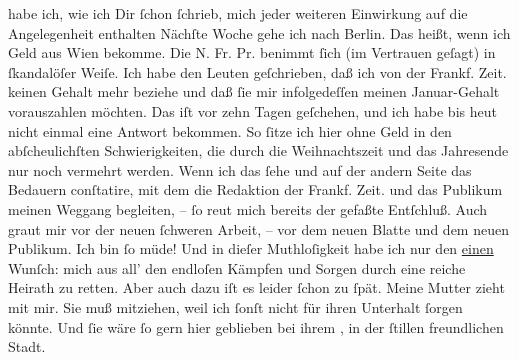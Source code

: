 \begin{ledgroupsized}[t]{13cm}
               habe ich, wie ich Dir ſchon ſchrieb, \strikeout{\textcolor{gray}{×}\-\textcolor{gray}{×}\-\textcolor{gray}{×}} mich jeder weiteren Einwirkung auf die Angelegenheit enthalten{\dotsfour}\pend
           \pstart
           Nächſte Woche gehe ich nach Berlin. Das heißt,
               wenn ich Geld aus Wien bekomme. Die N. Fr. Pr. benimmt ſich {\pb}(im
               Vertrauen geſagt) in ſkandalöſer Weiſe. Ich habe den Leuten geſchrieben, daß ich von der Frankf. Zeit. keinen Gehalt mehr beziehe und daß ſie mir
               infolgedeſſen meinen Januar-Gehalt vorauszahlen möchten.
               Das iſt vor zehn Tagen geſchehen, und ich habe bis heut nicht einmal eine Antwort bekommen. So ſitze ich hier ohne Geld in
               den abſcheulichſten Schwierigkeiten, die durch die Weihnachtszeit und das Jahresende
               nur noch vermehrt werden. Wenn ich das ſehe und auf der andern Seite das Bedauern
               conſtatire, mit dem die Redaktion der Frankf. Zeit. und das
               Publikum meinen Weggang begleiten, – ſo reut mich bereits der gefaßte Entſchluß. Auch
               graut mir vor der neuen ſchweren Arbeit, – vor dem neuen Blatte und dem neuen Publikum. Ich bin ſo
               müde! Und in dieſer Muthloſigkeit habe ich nur den \uline{einen} Wunſch: mich aus all’  den endloſen Kämpfen und Sorgen durch eine reiche Heirath zu retten. Aber auch
               dazu iſt es leider ſchon zu ſpät.\pend
           \pstart
           Meine Mutter zieht mit mir.
               Sie muß mitziehen, weil ich ſonſt nicht für ihren Unterhalt ſorgen könnte. Und ſie
               wäre ſo gern hier geblieben bei ihrem \label{K_L02900-7v}\label{K_L02900-7h}, in der ſtillen freundlichen Stadt.\pend

\end{ledgroupsized}
